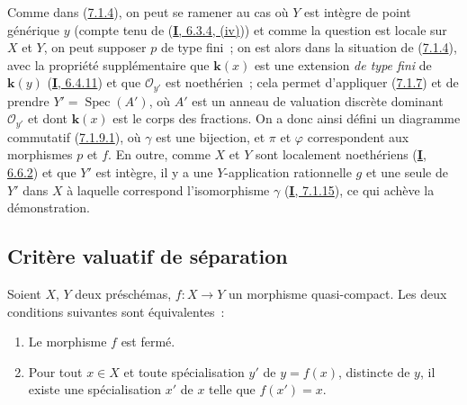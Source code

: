 Comme dans (\hyperref[II.7.1.4-fr]{7.1.4}), on peut se ramener au cas où $Y$
est intègre de point générique $y$ (compte tenu de
(\hyperref[I.6.3.4-fr]{\textbf{I}, 6.3.4, (iv)})) et comme la question est locale sur
$X$ et $Y$, on peut supposer $p$ de type fini~; on est alors dans la situation
de (\hyperref[II.7.1.4-fr]{7.1.4}), avec la propriété supplémentaire que
$\boldsymbol{k}(x)$ est une extension \emph{de type fini} de $\boldsymbol{k}(y)$
(\hyperref[I.6.4.11-fr]{\textbf{I}, 6.4.11}) et que $\mathcal{O}_{y'}$ est noethérien~;
cela permet d'appliquer (\hyperref[II.7.1.7-fr]{7.1.7}) et de prendre
$Y'=\operatorname{Spec}(A')$, où $A'$ est un anneau de valuation discrète
dominant $\mathcal{O}_{y'}$ et dont $\boldsymbol{k}(x)$ est le corps des fractions. On a
donc ainsi défini un diagramme commutatif
(\hyperref[II.7.1.9.1-fr]{7.1.9.1}), où $\gamma$ est une bijection, et $\pi$
et $\varphi$ correspondent aux morphismes $p$ et $f$. En outre, comme $X$ et
$Y$ sont localement noethériens (\hyperref[I.6.6.2-fr]{\textbf{I}, 6.6.2}) et que $Y'$
est intègre, il y a une $Y$-application rationnelle $g$ et une seule de $Y'$
dans $X$ à laquelle correspond l'isomorphisme $\gamma$
(\hyperref[I.7.1.15-fr]{\textbf{I}, 7.1.15}), ce qui achève la démonstration.

\subsection{Critère valuatif de séparation}
\label{subsection:II.7.2-fr}

\begin{proposition}[7.2.1]
\label{II.7.2.1-fr}
Soient $X$, $Y$ deux préschémas, $f:X\to Y$ un morphisme quasi-compact. Les
deux conditions suivantes sont équivalentes~:
\begin{enumerate}
\item[\rm a)] Le morphisme $f$ est fermé.
\item[\rm b)] Pour tout $x\in X$ et toute spécialisation $y'$ de $y=f(x)$,
distincte de $y$, il existe une spécialisation $x'$ de $x$ telle que
$f(x')=x$.
\end{enumerate}
\end{proposition}

